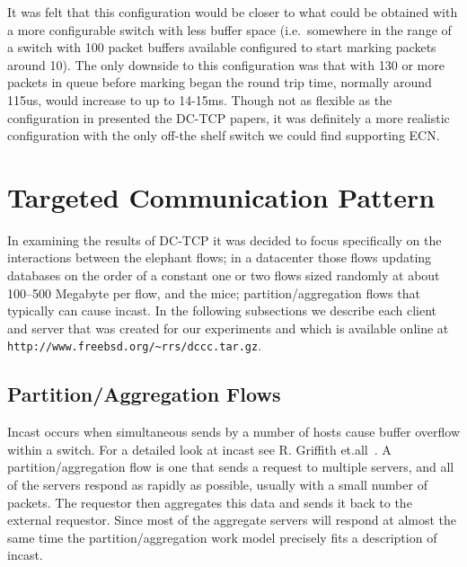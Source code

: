 \documentclass[12pt]{article}
\begin{document}
 It was felt that this configuration would be closer to what could be obtained with a more
 configurable switch with less buffer space (i.e.~somewhere in the range of a switch with
 100 packet buffers available configured to start marking packets around 10).  The only downside
 to this configuration was that with 130 or more packets in queue before marking began the
 round trip time, normally around 115us, would increase to up to 14-15ms.
 Though not as flexible as the configuration in presented the DC-TCP papers, it was definitely a more realistic configuration with the only
 off-the shelf  switch we could find supporting ECN.
 
\section{Targeted Communication Pattern}
In examining the results of DC-TCP it was decided to focus specifically on the interactions between
the elephant flows; in a datacenter those flows updating databases on the order of a constant one or two flows
sized randomly at about 100--500 Megabyte per flow, and the mice; partition/aggregation flows that typically 
can cause incast. In the following subsections we describe each client and server that was created for
our experiments and which is available online at \texttt{http://www.freebsd.org/\textasciitilde rrs/dccc.tar.gz}.

\subsection{Partition/Aggregation Flows}
\label{partition}

Incast occurs when simultaneous sends by a number of hosts cause buffer overflow within
a switch. For a detailed look at incast see R. Griffith et.all~\cite{griffen}. A
partition/aggregation flow is one that sends a request to multiple servers, and all of the servers respond
as rapidly as possible, usually with a small number of packets. The requestor then aggregates
this data and sends it back to the external requestor. Since most of the aggregate servers will respond
at almost the same time the partition/aggregation work model precisely fits a description of incast. 
\end{document}
